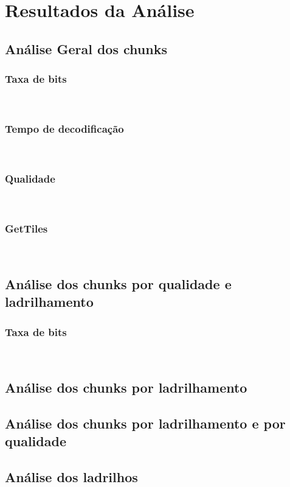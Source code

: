 

\chapter{Resultados da Análise}\label{Cap:Results}
\section{Análise Geral dos chunks}
\subsection{Taxa de bits}\\
\subsection{Tempo de decodificação}\\
\subsection{Qualidade}\\
\subsection{GetTiles}\\
\section{Análise dos chunks por qualidade e ladrilhamento}
\subsection{Taxa de bits}\\
\section{Análise dos chunks por ladrilhamento}
\section{Análise dos chunks por ladrilhamento e por qualidade}
\section{Análise dos ladrilhos}

